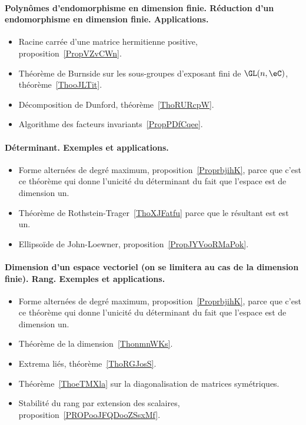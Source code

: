 \paragraph{Polynômes d'endomorphisme en dimension finie. Réduction d’un endomorphisme en dimension finie. Applications.}
\begin{itemize}
	\item Racine carrée d'une matrice hermitienne positive, proposition~\ref{PropVZvCWn}.
	\item Théorème de Burnside sur les sous-groupes d'exposant fini de \( \GL(n,\eC)\), théorème~\ref{ThooJLTit}.
	\item Décomposition de Dunford, théorème~\ref{ThoRURcpW}.
	\item Algorithme des facteurs invariants~\ref{PropPDfCqee}.
\end{itemize}
\paragraph{Déterminant. Exemples et applications.}
\begin{itemize}
	\item Forme alternées de degré maximum, proposition~\ref{ProprbjihK}, parce que c'est ce théorème qui donne l'unicité du déterminant du fait que l'espace est de dimension un.
	\item Théorème de Rothstein-Trager~\ref{ThoXJFatfu} parce que le résultant est est un.
	\item Ellipsoïde de John-Loewner, proposition~\ref{PropJYVooRMaPok}.
\end{itemize}
\paragraph{Dimension d'un espace vectoriel (on se limitera au cas de la dimension finie). Rang. Exemples et applications.}
\begin{itemize}
	\item Forme alternées de degré maximum, proposition~\ref{ProprbjihK}, parce que c'est ce théorème qui donne l'unicité du déterminant du fait que l'espace est de dimension un.
	\item Théorème de la dimension~\ref{ThonmnWKs}.
	\item Extrema liés, théorème~\ref{ThoRGJosS}.
	\item Théorème~\ref{ThoeTMXla} sur la diagonalisation de matrices symétriques.
	\item Stabilité du rang par extension des scalaires, proposition~\ref{PROPooJFQDooZSsxMf}.
\end{itemize}
